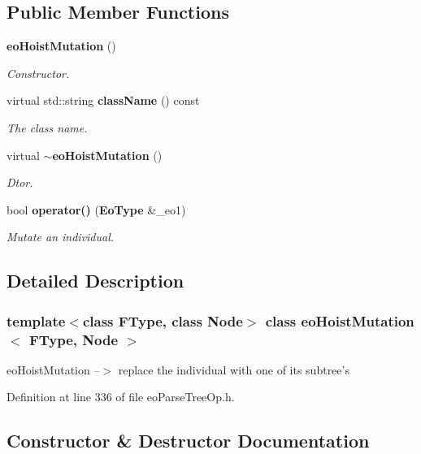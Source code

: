 \subsection*{Public Member Functions}
\begin{CompactItemize}
\item 
{\bf eo\-Hoist\-Mutation} ()
\begin{CompactList}\small\item\em Constructor. \item\end{CompactList}\item 
virtual std::string {\bf class\-Name} () const \label{classeo_hoist_mutation_a1}

\begin{CompactList}\small\item\em The class name. \item\end{CompactList}\item 
virtual {\bf $\sim$eo\-Hoist\-Mutation} ()\label{classeo_hoist_mutation_a2}

\begin{CompactList}\small\item\em Dtor. \item\end{CompactList}\item 
bool {\bf operator()} ({\bf Eo\-Type} \&\_\-eo1)
\begin{CompactList}\small\item\em Mutate an individual. \item\end{CompactList}\end{CompactItemize}


\subsection{Detailed Description}
\subsubsection*{template$<$class FType, class Node$>$ class eo\-Hoist\-Mutation$<$ FType, Node $>$}

eo\-Hoist\-Mutation --$>$ replace the individual with one of its subtree's 



Definition at line 336 of file eo\-Parse\-Tree\-Op.h.

\subsection{Constructor \& Destructor Documentation}
